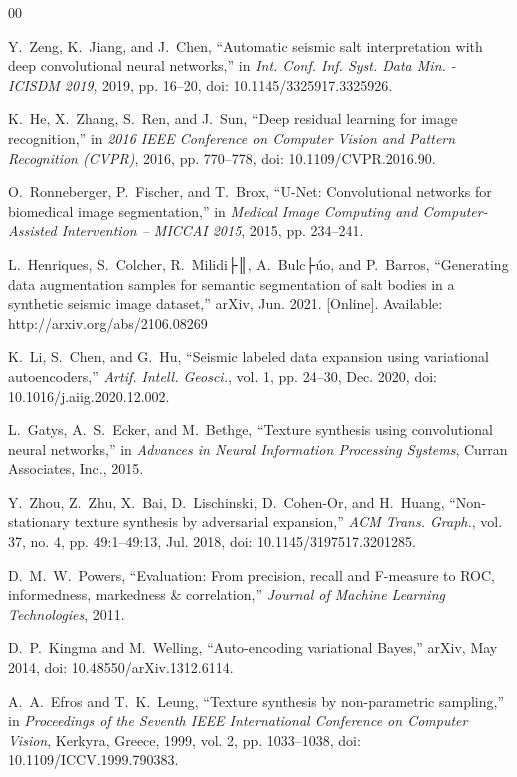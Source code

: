 ﻿\documentclass{ieeeaccess}
\begin{document}
\begin{thebibliography}{00}

Y.~Zeng, K.~Jiang, and J.~Chen, ``Automatic seismic salt interpretation with deep convolutional neural networks,'' in \emph{Int. Conf. Inf. Syst. Data Min. - ICISDM 2019}, 2019, pp. 16--20, doi: 10.1145/3325917.3325926.

K.~He, X.~Zhang, S.~Ren, and J.~Sun, ``Deep residual learning for image recognition,'' in \emph{2016 IEEE Conference on Computer Vision and Pattern Recognition (CVPR)}, 2016, pp. 770--778, doi: 10.1109/CVPR.2016.90.

O.~Ronneberger, P.~Fischer, and T.~Brox, ``U-Net: Convolutional networks for biomedical image segmentation,'' in \emph{Medical Image Computing and Computer-Assisted Intervention -- MICCAI 2015}, 2015, pp. 234--241.

L.~Henriques, S.~Colcher, R.~Milidi├║, A.~Bulc├úo, and P.~Barros, ``Generating data augmentation samples for semantic segmentation of salt bodies in a synthetic seismic image dataset,'' arXiv, Jun. 2021. [Online]. Available: http://arxiv.org/abs/2106.08269

K.~Li, S.~Chen, and G.~Hu, ``Seismic labeled data expansion using variational autoencoders,'' \emph{Artif. Intell. Geosci.}, vol. 1, pp. 24--30, Dec. 2020, doi: 10.1016/j.aiig.2020.12.002.

L.~Gatys, A.~S.~Ecker, and M.~Bethge, ``Texture synthesis using convolutional neural networks,'' in \emph{Advances in Neural Information Processing Systems}, Curran Associates, Inc., 2015.

Y.~Zhou, Z.~Zhu, X.~Bai, D.~Lischinski, D.~Cohen-Or, and H.~Huang, ``Non-stationary texture synthesis by adversarial expansion,'' \emph{ACM Trans. Graph.}, vol. 37, no. 4, pp. 49:1--49:13, Jul. 2018, doi: 10.1145/3197517.3201285.

D.~M.~W.~Powers, ``Evaluation: From precision, recall and F-measure to ROC, informedness, markedness \& correlation,'' \emph{Journal of Machine Learning Technologies}, 2011.

D.~P.~Kingma and M.~Welling, ``Auto-encoding variational Bayes,'' arXiv, May 2014, doi: 10.48550/arXiv.1312.6114.

A.~A.~Efros and T.~K.~Leung, ``Texture synthesis by non-parametric sampling,'' in \emph{Proceedings of the Seventh IEEE International Conference on Computer Vision}, Kerkyra, Greece, 1999, vol. 2, pp. 1033--1038, doi: 10.1109/ICCV.1999.790383.


\end{thebibliography}
\end{document}
